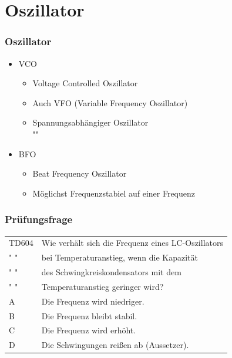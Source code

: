 \section*{Oszillator}

\begin{frame}
    \frametitle{Oszillator}
    \begin{center}
    \begin{itemize}
			\item VCO
			\begin{itemize}
				\item Voltage Controlled Oszillator
				\item Auch VFO (Variable Frequency Oszillator)
				\item Spannungsabhängiger Oszillator \\ ""
   			\end{itemize}
			\item BFO
			\begin{itemize}
				\item Beat Frequency Oszillator
				\item Möglichst Frequenzstabiel auf einer Frequenz
    		\end{itemize}
    \end{itemize}
	\end{center}
\end{frame}

\begin{frame}
    \frametitle{Prüfungsfrage}

    \begin{center}
    \begin{tabular}{l||l}\hline
        TD604 &Wie verhält sich die Frequenz eines LC-Oszillators \\
         " "  & bei Temperaturanstieg, wenn die Kapazität \\
         " "  & des Schwingkreiskondensators mit dem \\
         " "  & Temperaturanstieg geringer wird? \\ \hline\hline
         A & Die Frequenz wird niedriger. \\\hline
         B & Die Frequenz bleibt stabil. \\\hline
         C & Die Frequenz wird erhöht. \\ \hline
         D & Die Schwingungen reißen ab (Aussetzer).\\\hline
    \end{tabular}
 	\end{center}
\end{frame}

